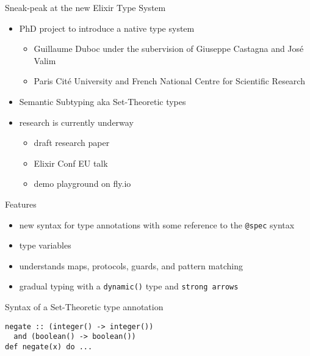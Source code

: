 \documentclass[
  ignorenonframetext,
]{beamer}
\newcommand{\passthrough}[1]{#1}
\providecommand{\tightlist}{%
  \setlength{\itemsep}{0pt}\setlength{\parskip}{0pt}}
\begin{document}
\begin{frame}{Sneak-peak at the new Elixir Type System}
\protect\hypertarget{sneak-peak-at-the-new-elixir-type-system}{}
\begin{itemize}
\tightlist
\item
  PhD project to introduce a native type system

  \begin{itemize}
  \tightlist
  \item
    Guillaume Duboc under the subervision of Giuseppe Castagna and José
    Valim
  \item
    Paris Cité University and French National Centre for Scientific
    Research
  \end{itemize}
\item
  Semantic Subtyping aka Set-Theoretic types
\item
  research is currently underway

  \begin{itemize}
  \tightlist
  \item
    draft research paper
  \item
    Elixir Conf EU talk
  \item
    demo playground on fly.io
  \end{itemize}
\end{itemize}
\end{frame}

\begin{frame}[fragile]{Features}
\protect\hypertarget{features}{}
\begin{itemize}
\tightlist
\item
  new syntax for type annotations with some reference to the
  \passthrough{\lstinline!@spec!} syntax
\item
  type variables
\item
  understands maps, protocols, guards, and pattern matching
\item
  gradual typing with a \passthrough{\lstinline!dynamic()!} type and
  \passthrough{\lstinline!strong arrows!}
\end{itemize}
\end{frame}

\begin{frame}[fragile]{Syntax of a Set-Theoretic type annotation}
\protect\hypertarget{syntax-of-a-set-theoretic-type-annotation}{}
\begin{lstlisting}
negate :: (integer() -> integer())
  and (boolean() -> boolean())
def negate(x) do ...
\end{lstlisting}
\end{frame}
\end{document}
